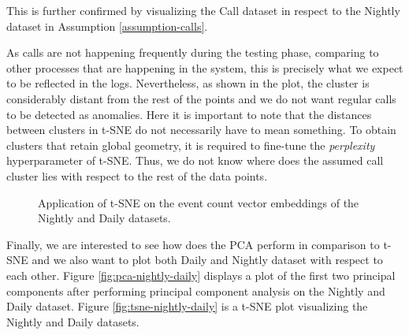 This is further confirmed by visualizing the Call dataset in respect to the Nightly dataset in Assumption \ref{assumption-calls}.

As calls are not happening frequently during the testing phase, comparing to other processes that are happening in the system, this is precisely what we expect to be reflected in the logs. Nevertheless, as shown in the plot, the cluster is considerably distant from the rest of the points and we do not want regular calls to be detected as anomalies. Here it is important to note that the distances between clusters in t-SNE do not necessarily have to mean something. To obtain clusters that retain global geometry, it is required to fine-tune the \textit{perplexity} hyperparameter of t-SNE. Thus, we do not know where does the assumed call cluster lies with respect to the rest of the data points.

\begin{figure}%
    \centering
    \qquad
    \caption{Application of t-SNE on the event count vector embeddings of the Nightly and Daily datasets.}%
    \label{fig:tsne-single}%
\end{figure}

Finally, we are interested to see how does the PCA perform in comparison to t-SNE and we also want to plot both Daily and Nightly dataset with respect to each other. Figure \ref{fig:pca-nightly-daily} displays a plot of the first two principal components after performing principal component analysis on the Nightly and Daily dataset. Figure \ref{fig:tsne-nightly-daily} is a t-SNE plot visualizing the Nightly and Daily datasets.

